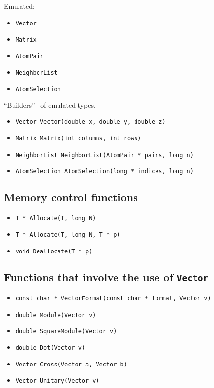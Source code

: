 \documentclass[a4paper,12pt]{article}
\begin{document}
Emulated:

\begin{itemize}
\item \verb'Vector'
\item \verb'Matrix'
\item \verb'AtomPair'
\item \verb'NeighborList'
\item \verb'AtomSelection'
\end{itemize}

``Builders''\footnotemark ~ of emulated types.

\begin{itemize}
\item \verb'Vector Vector(double x, double y, double z)'
\item \verb'Matrix Matrix(int columns, int rows)'
\item \verb'NeighborList NeighborList(AtomPair * pairs, long n)'
\item \verb'AtomSelection AtomSelection(long * indices, long n)'

\end{itemize}


\subsection{Memory control functions}

\begin{itemize}
\item \verb'T * Allocate(T, long N)'
\item \verb'T * Allocate(T, long N, T * p)'
\item \verb'void Deallocate(T * p)'
\end{itemize}

\subsection{Functions that involve the use of \texttt{Vector}}

\begin{itemize}
\item \verb'const char * VectorFormat(const char * format, Vector v)'
\item \verb'double Module(Vector v)'
\item \verb'double SquareModule(Vector v)'
\item \verb'double Dot(Vector v)'
\item \verb'Vector Cross(Vector a, Vector b)'
\item \verb'Vector Unitary(Vector v)'
\end{itemize}
\end{document}
